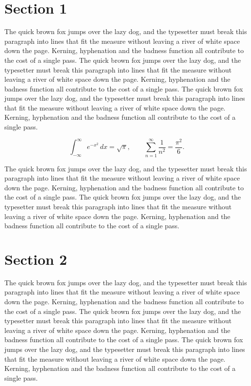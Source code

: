 \documentclass{article}
\begin{document}
\section{Section 1}
The quick brown fox jumps over the lazy dog, and the typesetter must break this paragraph into lines that fit the measure without leaving a river of white space down the page. Kerning, hyphenation and the badness function all contribute to the cost of a single pass. The quick brown fox jumps over the lazy dog, and the typesetter must break this paragraph into lines that fit the measure without leaving a river of white space down the page. Kerning, hyphenation and the badness function all contribute to the cost of a single pass. The quick brown fox jumps over the lazy dog, and the typesetter must break this paragraph into lines that fit the measure without leaving a river of white space down the page. Kerning, hyphenation and the badness function all contribute to the cost of a single pass. 

\begin{equation}
\int_{-\infty}^{\infty} e^{-x^{2}}\,dx = \sqrt{\pi}, \qquad
\sum_{n=1}^{\infty} \frac{1}{n^{2}} = \frac{\pi^{2}}{6}.
\end{equation}

The quick brown fox jumps over the lazy dog, and the typesetter must break this paragraph into lines that fit the measure without leaving a river of white space down the page. Kerning, hyphenation and the badness function all contribute to the cost of a single pass. The quick brown fox jumps over the lazy dog, and the typesetter must break this paragraph into lines that fit the measure without leaving a river of white space down the page. Kerning, hyphenation and the badness function all contribute to the cost of a single pass. 
\section{Section 2}
The quick brown fox jumps over the lazy dog, and the typesetter must break this paragraph into lines that fit the measure without leaving a river of white space down the page. Kerning, hyphenation and the badness function all contribute to the cost of a single pass. The quick brown fox jumps over the lazy dog, and the typesetter must break this paragraph into lines that fit the measure without leaving a river of white space down the page. Kerning, hyphenation and the badness function all contribute to the cost of a single pass. The quick brown fox jumps over the lazy dog, and the typesetter must break this paragraph into lines that fit the measure without leaving a river of white space down the page. Kerning, hyphenation and the badness function all contribute to the cost of a single pass. 
\end{document}
